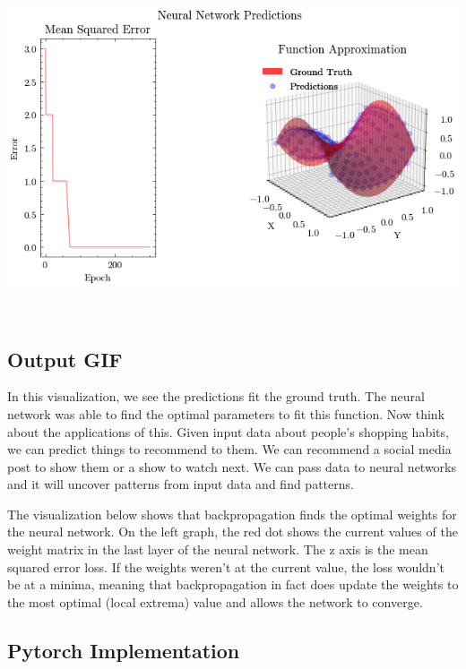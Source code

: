 \documentclass[openany]{book}
\begin{document}
    \begin{center}
    \includegraphics[width=\textwidth]{combined_files/combined_188_2.png}
    \end{center}
    { \hspace*{\fill} \\}
    
    \subsection{Output GIF}\label{output-gif}

In this visualization, we see the predictions fit the ground truth. The
neural network was able to find the optimal parameters to fit this
function. Now think about the applications of this. Given input data
about people's shopping habits, we can predict things to recommend to
them. We can recommend a social media post to show them or a show to
watch next. We can pass data to neural networks and it will uncover
patterns from input data and find patterns.
        
    The visualization below shows that backpropagation finds the optimal
weights for the neural network. On the left graph, the red dot shows the
current values of the weight matrix in the last layer of the neural
network. The z axis is the mean squared error loss. If the weights
weren't at the current value, the loss wouldn't be at a minima, meaning
that backpropagation in fact does update the weights to the most optimal
(local extrema) value and allows the network to converge.
        
    \subsection{Pytorch Implementation}\label{pytorch-implementation}
\end{document}
